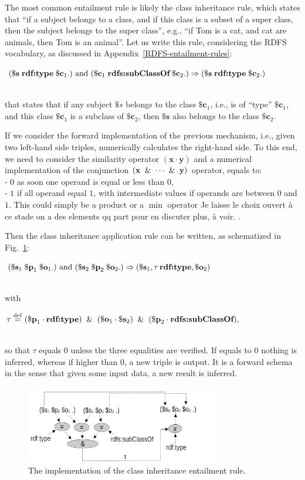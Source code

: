 \documentclass[a4]{article}
\newcommand{\vthierry}[2]{{\color{magenta} #1} \sout{#2}}
\newcommand{\deq}{\stackrel {\rm def}{=}}
\newcommand{\tab}{\hphantom{~}}
\newcommand{\eqline}[1]{~\vspace{0.1cm}\\\centerline{$#1$}\vspace{0.1cm}\\}
\begin{document}
The most common entailment rule is likely the class inheritance rule, which states that ``if a subject belongs to a class, and if this class is a subset of a super class, then the subject belongs to the super class'', e.g., ``if Tom is a cat, and cat are animals, then Tom is an animal''. Let us write this rule, considering the RDFS vocabulary, as discussed in Appendix~\ref{RDFS-entailment-rules}:
\eqline{(\mathbf{\$s} \; \texttt{\bf rdf:type} \; \mathbf{\$c}_1 .) \mbox{ and } (\mathbf{\$c}_1 \; \texttt{\bf rdfs:subClassOf} \; \mathbf{\$c}_2 .) \Rightarrow (\mathbf{\$s} \; \texttt{\bf rdf:type} \; \mathbf{\$c}_2 .)}
that states that if any subject $\$s$ belongs to the class $\mathbf{\$c}_1$, i.e., is of ``type'' $\mathbf{\$c}_1$, and this class $\mathbf{\$c}_1$ is a subclass of $\mathbf{\$c}_2$, then $\mathbf{\$s}$ also belongs to the class $\mathbf{\$c}_2$.

If we consider the forward implementation of the previous mechanism, i.e., given two left-hand side triples, numerically calculates the right-hand side. To this end, we need to consider the similarity operator $(\mathbf{x} \cdot \mathbf{y})$ and a numerical implementation of the conjunction $(\mathbf{x} \And \cdots \And \mathbf{y})$ operator, equals to:
\\ \tab \tab - $0$ as soon one operand is equal or less than $0$, 
\\ \tab \tab - $1$ if all operand equal $1$,
with intermediate values if operands are between $0$ and $1$. This could simply be a product or a $\min$ operator \vthierry{Je laisse le choix ouvert à ce stade on a des elements qq part pour en discuter plus, à voir.}{}.

Then the class inheritance application rule can be written, as schematized in Fig.~\ref{rdfs9-derivation}:
\eqline{(\mathbf{\$s}_1 \; \mathbf{\$p}_1 \; \mathbf{\$o}_1 .) \mbox{ and } (\mathbf{\$s}_2 \; \mathbf{\$p}_2 \; \mathbf{\$o}_2 .) \Rightarrow (\mathbf{\$s}_1, \tau \, \texttt{\bf rdf:type}, \mathbf{\$o}_2)}
with 
\eqline{\tau \deq (\mathbf{\$p}_1 \cdot \texttt{\bf rdf:type}) \And (\mathbf{\$o}_1 \cdot \mathbf{\$s}_2) \And (\mathbf{\$p}_2 \cdot \texttt{\bf rdfs:subClassOf}),}
so that $\tau$ equals $0$ unless the three equalities are verified. If equals to $0$ nothing is inferred, whereas if higher than $0$, a new triple is output. It is a forward schema in the sense that given some input data, a new result is inferred.

\begin{figure}[ht]
 \centerline{\includegraphics[width=0.75\textwidth]{figures/rdfs9-derivation.png}}
 \caption{The implementation of the class inheritance entailment rule.}
 \label{rdfs9-derivation}
\end{figure}
\end{document}
